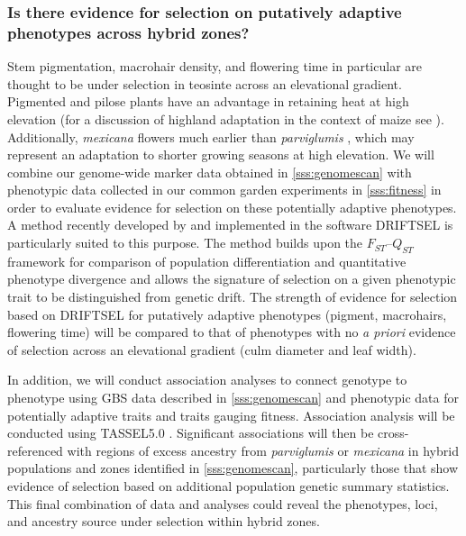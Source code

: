 		
\subsubsection{Is there evidence for selection on putatively adaptive phenotypes across hybrid zones?}
\label{sss:driftsel}
Stem pigmentation, macrohair density, and flowering time in particular are thought to be under selection in teosinte across an elevational gradient.  Pigmented and pilose plants have an advantage in retaining heat at high elevation (for a discussion of highland adaptation in the context of maize see \citealt{Eagles1994}). Additionally, \emph{mexicana} flowers much earlier than \emph{parviglumis} \citep{Rodriguez2006}, which may represent an adaptation to shorter growing seasons at high elevation. We will combine our genome-wide marker data obtained in \ref{sss:genomescan} with phenotypic data collected in our common garden experiments in \ref{sss:fitness} in order to evaluate evidence for selection on these potentially adaptive phenotypes.  A method recently developed by \citet{Ovaskainen2011} and implemented in the software DRIFTSEL \citep{Karhunen2013} is particularly suited to this purpose.  The method builds upon the $F_{ST}$--$Q_{ST}$ framework for comparison of population differentiation and quantitative phenotype divergence and allows the signature of selection on a given phenotypic trait to be distinguished from genetic drift.  The strength of evidence for selection based on DRIFTSEL for putatively adaptive phenotypes (pigment, macrohairs, flowering time) will be compared to that of phenotypes with no \emph{a priori} evidence of selection across an elevational gradient (culm diameter and leaf width). 

In addition, we will conduct association analyses to connect genotype to phenotype using GBS data described in \ref{sss:genomescan} and phenotypic data for potentially adaptive traits and traits gauging fitness.  Association analysis will be conducted using TASSEL5.0 \citep{Bradbury2007}. Significant associations will then be cross-referenced with regions of excess ancestry from \emph{parviglumis} or \emph{mexicana} in hybrid populations and zones identified in \ref{sss:genomescan}, particularly those that show evidence of selection based on additional population genetic summary statistics.  This final combination of data and analyses could reveal the phenotypes, loci, and ancestry source under selection within hybrid zones.

